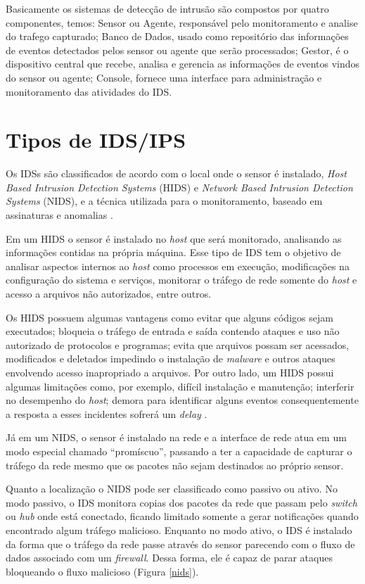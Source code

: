 \documentclass[
	12pt,				
	openright,		
	twoside,	
	a4paper,
	english,	
	brazil	
	]{abntex2}
\begin{document}
 Basicamente os sistemas de detecção de intrusão são compostos por quatro componentes, temos: Sensor ou Agente, responsável pelo monitoramento e analise do trafego capturado; Banco de Dados, usado como repositório das informações de eventos detectados pelos sensor ou agente que serão processados; Gestor, é o dispositivo central que recebe, analisa e gerencia as informações de eventos vindos do sensor ou agente; Console, fornece uma interface para administração e monitoramento das atividades do IDS.

 \section{Tipos de IDS/IPS}

 Os IDSs são classificados de acordo com o local onde o sensor é instalado, \textit{Host Based Intrusion Detection Systems} (HIDS) e \textit{Network Based Intrusion Detection Systems} (NIDS), e a técnica utilizada para o monitoramento, baseado em assinaturas e anomalias \cite{nagahama2012ipsflow}.

 Em um HIDS o sensor é instalado no \textit{host} que será monitorado, analisando as informações contidas na própria máquina. Esse tipo de IDS tem o objetivo de analisar aspectos internos ao \textit{host} como processos em execução, modificações na configuração do sistema e serviços, monitorar o tráfego de rede somente do \textit{host} e acesso a arquivos não autorizados, entre outros.

 Os HIDS possuem algumas vantagens como evitar que alguns códigos sejam executados; bloqueia o tráfego de entrada e saída contendo ataques e uso não autorizado de protocolos e programas; evita que arquivos possam ser acessados, modificados e deletados impedindo o instalação de \textit{malware} e outros ataques envolvendo acesso inapropriado a arquivos. Por outro lado, um HIDS possui algumas limitações como, por exemplo, difícil instalação e manutenção; interferir no desempenho do \textit{host}; demora para identificar alguns eventos consequentemente a resposta a esses incidentes sofrerá um \textit{delay} \cite{scarfone01}.

 Já em um NIDS, o sensor é instalado na rede e a interface de rede atua em um modo especial chamado ``promíscuo'', passando a ter a capacidade de capturar o tráfego da rede mesmo que os pacotes não sejam destinados ao próprio sensor.

 Quanto a localização o NIDS pode ser classificado como passivo ou ativo. No modo passivo, o IDS monitora copias dos pacotes da rede que passam pelo \textit{switch} ou \textit{hub} onde está conectado, ficando limitado somente a gerar notificações quando encontrado algum tráfego malicioso. Enquanto no modo ativo, o IDS é instalado da forma que o tráfego da rede passe através do sensor parecendo com o fluxo de dados associado com um \textit{firewall}. Dessa forma, ele é capaz de parar ataques bloqueando o fluxo malicioso (Figura \ref{nids}). 
\end{document}
